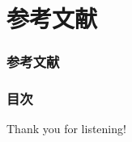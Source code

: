 \section*{参考文献}
\begin{frame}
  \frametitle{参考文献}

  
  \nocite{*}
  
\end{frame}

\begin{frame}
  \frametitle{目次}

  \tableofcontents[hideallsubsections]
\end{frame}

\begin{frame}
  \centering
  {\Huge Thank you for listening!}
\end{frame}


